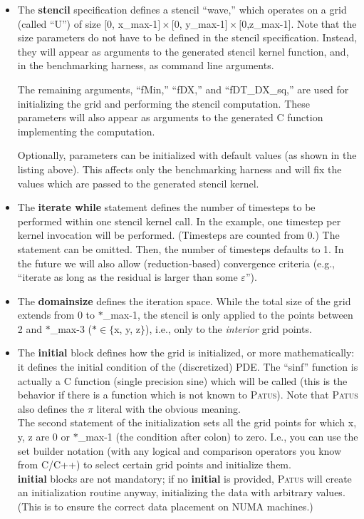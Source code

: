 \begin{itemize}
  \item The \textbf{stencil} specification defines a stencil ``wave,'' which operates on a grid (called ``U'')
    of size $[$0, x\_max-1$] \times [$0, y\_max-1$] \times [$0,z\_max-1$]$.
    Note that the size parameters do not have to be defined in the stencil specification.
    Instead, they will appear as arguments to the generated stencil kernel function, and, in the
    benchmarking harness, as command line arguments.
    
    The remaining arguments, ``fMin,'' ``fDX,'' and ``fDT\_DX\_sq,'' are used for initializing the grid
    and performing the stencil computation. These parameters will also appear as arguments to the generated
    C function implementing the computation.

    Optionally, parameters can be initialized with default
    values (as shown in the listing above). This affects only the benchmarking harness and will fix the
    values which are passed to the generated stencil kernel.

  \item The \textbf{iterate while} statement defines the number of timesteps to be performed within one stencil kernel call.
    In the example, one timestep per kernel invocation will be performed. (Timesteps are counted from 0.)
    The statement can be omitted. Then, the number of timesteps defaults to 1.
    In the future we will also allow (reduction-based) convergence criteria (e.g., ``iterate as long as the residual is
    larger than some $\varepsilon$'').
    
  \item The \textbf{domainsize} defines the iteration space. While the total size of the grid extends from 0 to $\ast$\_max-1,
    the stencil is only applied to the points between 2 and $\ast$\_max-3 ($\ast \in \{$x, y, z$\}$), i.e., only
    to the \emph{interior} grid points.
    
  \item The \textbf{initial} block defines how the grid is initialized, or more mathematically: it defines the initial condition
    of the (discretized) PDE. The ``sinf'' function is actually a C function (single precision sine)
    which will be called (this is the behavior
    if there is a function which is not known to \textsc{Patus}).
    Note that \textsc{Patus} also defines the $\pi$ literal with the obvious meaning.\\
    The second statement of the initialization sets all the grid points for which x, y, z are 0 or $\ast$\_max-1
    (the condition after colon) to zero. I.e., you can use the set builder notation (with any logical and comparison operators you know from C/C++)
    to select certain grid points and initialize them.\\
    \textbf{initial} blocks are not mandatory; if no \textbf{initial} is provided, \textsc{Patus} will create an initialization
    routine anyway, initializing the data with arbitrary values. (This is to ensure the correct data placement on NUMA machines.)
    

\end{itemize}
